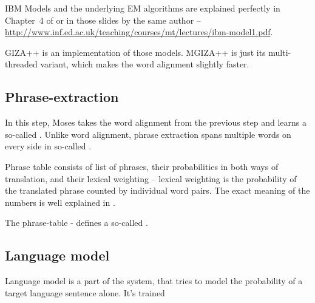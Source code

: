 IBM Models and the underlying EM algorithms are explained perfectly in Chapter~4 of \cite{koehn2010statistical} or in those slides by the same author -- \url{http://www.inf.ed.ac.uk/teaching/courses/mt/lectures/ibm-model1.pdf}.

GIZA++ is an implementation of those models. MGIZA++ is just its multi-threaded variant, which makes the word alignment slightly faster.

\subsection{Phrase-extraction}
In this step, Moses takes the word alignment from the previous step and learns a so-called .
Unlike word alignment, phrase extraction spans multiple words on every side in so-called .

Phrase table consists of list of phrases, their probabilities in both ways of translation, and their lexical weighting -- lexical weighting is the probability of the translated phrase counted by individual word pairs. The exact meaning of the numbers is well explained in \cite{koehn2003}.

The phrase-table - defines a so-called . 

\subsection{Language model}
Language model is a part of the system, that tries to model the probability of a target language sentence alone. It's trained
